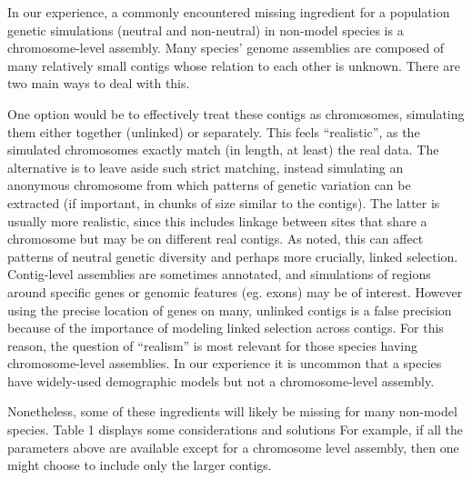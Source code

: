 \documentclass[hidelinks]{article}
\begin{document}
In our experience, a commonly encountered missing ingredient for a
population genetic simulations (neutral and non-neutral) in non-model
species is a chromosome-level assembly. Many species' genome assemblies
are composed of many relatively small contigs whose relation to each
other is unknown. There are two main ways to deal with this.

One option would be to effectively treat these contigs as chromosomes,
simulating them either together (unlinked) or separately. This feels
``realistic'', as the simulated chromosomes exactly match (in length, at
least) the real data. The alternative is to leave aside such strict
matching, instead simulating an anonymous chromosome from which patterns
of genetic variation can be extracted (if important, in chunks of size
similar to the contigs). The latter is usually more realistic,
since this includes linkage between sites that share a chromosome but
may be on different real contigs. As noted, this can affect patterns of neutral genetic
diversity and perhaps more crucially, linked selection. Contig-level
assemblies are sometimes annotated, and simulations of regions around
specific genes or genomic features (eg. exons) may be of interest.
However using the precise location of genes on many, unlinked contigs is
a false precision because of the importance of modeling linked selection
across contigs. For this reason, the question of ``realism'' is most
relevant for those species having chromosome-level assemblies. In our
experience it is uncommon that a species have widely-used demographic
models but not a chromosome-level assembly.

Nonetheless, some of these ingredients will likely be missing for many
non-model species. Table 1 displays some considerations and solutions
For example, if all the parameters above are available except for a
chromosome level assembly, then one might choose to include only the
larger contigs.
\end{document}
